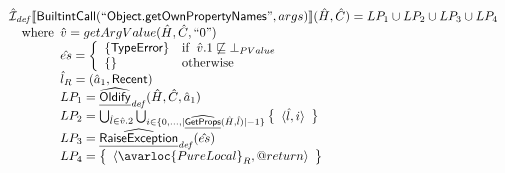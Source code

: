 \[\begin{array}{l}
\aI_{\it def}\lbr \SF{BuiltintCall}(``\SF{Object.getOwnPropertyNames}",args)\rbr(\hat{H},\hat{C}) = LP_1 \cup LP_2 \cup LP_3 \cup LP_4\\
\quad\wherec{
  \hat{v} = getArgValue(\hat{H}, \hat{C}, ``0")\\
  \hat{es} = \left\{\begin{array}{ll}
      \{ \SF{TypeError} \}
      & \ifc{\hat{v}.1 \not\sqsubseteq \bot_{PValue}}\\
      \set{} & \owc
    \end{array}\right.\\
  \hat{l}_R = (\hat{a}_1, \SF{Recent})\\
  LP_1 = \ahf{Oldify}_{\it def}(\hat{H}, \hat{C}, \hat{a}_1)\\
  LP_2 = \bigcup_{\hat{l} \in \hat{v}.2} \bigcup_{i \in \{0, ..., |\ahf{GetProps}(\hat{H},\hat{l})|-1\}}
    \set{\langle \hat{l}, i\rangle}\\
  LP_3 = \ahf{RaiseException}_{\it def}(\hat{es})\\
  LP_4 = \set{\langle\avarloc{PureLocal}_R,\varprop{return}\rangle}\\
  }\\
\\

\end{array}
\]
